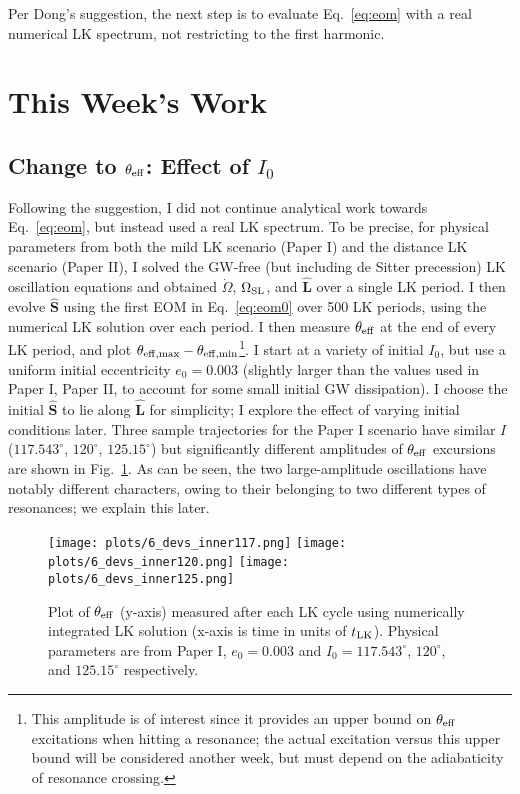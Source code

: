 \documentclass[11pt,
        usenames, %
        dvipsnames %
    ]{article}
\newcommand*{\bm}[1]{\boldsymbol{\mathbf{#1}}}
\newcommand*{\uv}[1]{\hat{\bm{#1}}}
\begin{document}
Per Dong's suggestion, the next step is to evaluate Eq.~\eqref{eq:eom} with a
real numerical LK spectrum, not restricting to the first harmonic.

\section{This Week's Work}

\subsection{Change to $\theta_{\rm eff}$: Effect of $I_0$}\label{ss:sims}

Following the suggestion, I did not continue analytical work towards
Eq.~\eqref{eq:eom}, but instead used a real LK spectrum. To be precise, for
physical parameters from both the mild LK scenario (Paper I) and the distance LK
scenario (Paper II), I solved the GW-free (but including de Sitter precession)
LK oscillation equations and obtained $\dot{\Omega}$, $\Omega_{\rm SL}$, and
$\uv{L}$ over a single LK period. I then evolve $\uv{S}$ using the first EOM in
Eq.~\eqref{eq:eom0} over 500 LK periods, using the numerical LK solution over
each period. I then measure $\theta_{\rm eff}$ at the end of every LK period,
and plot $\theta_{\rm eff, \max} - \theta_{\rm eff, \min}$\footnote{This
amplitude is of interest since it provides an upper bound on $\theta_{\rm eff}$
excitations when hitting a resonance; the actual excitation versus this upper
bound will be considered another week, but must depend on the adiabaticity of
resonance crossing.}. I start at a variety of initial $I_0$, but use a uniform
initial eccentricity $e_0 = 0.003$ (slightly larger than the values used in
Paper I, Paper II, to account for some small initial GW dissipation). I choose
the initial $\uv{S}$ to lie along $\uv{L}$ for simplicity; I explore the effect
of varying initial conditions later. Three sample trajectories for the Paper I
scenario have similar $I$ ($117.543^\circ$, $120^\circ$, $125.15^\circ$) but
significantly different amplitudes of $\theta_{\rm eff}$ excursions are shown in
Fig.~\ref{fig:inners}. As can be seen, the two large-amplitude oscillations have
notably different characters, owing to their belonging to two different types of
resonances; we explain this later.
\begin{figure}
    \centering
    \texttt{[image: plots/6\_devs\_inner117.png]}
    \texttt{[image: plots/6\_devs\_inner120.png]}
    \texttt{[image: plots/6\_devs\_inner125.png]}
    \caption{Plot of $\theta_{\rm eff}$ (y-axis) measured after each LK cycle
    using numerically integrated LK solution (x-axis is time in units of $t_{\rm
    LK}$). Physical parameters are from Paper I, $e_0 = 0.003$ and $I_0 =
    117.543^\circ$, $120^\circ$, and $125.15^\circ$
    respectively.}\label{fig:inners}
\end{figure}
\end{document}

